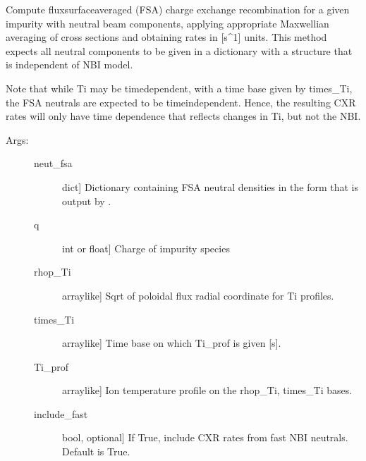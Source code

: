 \documentclass[letterpaper,10pt,english]{sphinxmanual}
\begin{document}
\begin{fulllineitems}
\label{\detokenize{aurora:aurora.nbi_neutrals.get_NBI_imp_cxr_q}}
Compute flux\sphinxhyphen{}surface\sphinxhyphen{}averaged (FSA) charge exchange recombination for a given impurity with
neutral beam components, applying appropriate Maxwellian averaging of cross sections and
obtaining rates in {[}s\textasciicircum{}\sphinxhyphen{}1{]} units. This method expects all neutral components to be given in a
dictionary with a structure that is independent of NBI model.

Note that while Ti may be time\sphinxhyphen{}dependent, with a time base given by times\_Ti, the FSA
neutrals are expected to be time\sphinxhyphen{}independent. Hence, the resulting CXR rates will only have
time dependence that reflects changes in Ti, but not the NBI.
\begin{description}
\item[{Args:}] \leavevmode\begin{description}
\item[{neut\_fsa}] \leavevmode{[}dict{]}
Dictionary containing FSA neutral densities in the form that is output by {\hyperref[\detokenize{aurora:aurora.nbi_neutrals.get_neutrals_fsa}]{}}.

\item[{q}] \leavevmode{[}int or float{]}
Charge of impurity species

\item[{rhop\_Ti}] \leavevmode{[}array\sphinxhyphen{}like{]}
Sqrt of poloidal flux radial coordinate for Ti profiles.

\item[{times\_Ti}] \leavevmode{[}array\sphinxhyphen{}like{]}
Time base on which Ti\_prof is given {[}s{]}.

\item[{Ti\_prof}] \leavevmode{[}array\sphinxhyphen{}like{]}
Ion temperature profile on the rhop\_Ti, times\_Ti bases.

\item[{include\_fast}] \leavevmode{[}bool, optional{]}
If True, include CXR rates from fast NBI neutrals. Default is True.


\end{description}
\end{description}
\end{fulllineitems}
\end{document}
